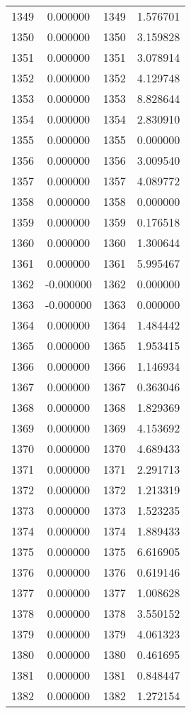 \documentclass[12pt]{article}
\begin{document}
\begin{longtable}{@{}cccc@{}}
1349 & 0.000000 & 1349 & 1.576701 \\
1350 & 0.000000 & 1350 & 3.159828 \\
1351 & 0.000000 & 1351 & 3.078914 \\
1352 & 0.000000 & 1352 & 4.129748 \\
1353 & 0.000000 & 1353 & 8.828644 \\
1354 & 0.000000 & 1354 & 2.830910 \\
1355 & 0.000000 & 1355 & 0.000000 \\
1356 & 0.000000 & 1356 & 3.009540 \\
1357 & 0.000000 & 1357 & 4.089772 \\
1358 & 0.000000 & 1358 & 0.000000 \\
1359 & 0.000000 & 1359 & 0.176518 \\
1360 & 0.000000 & 1360 & 1.300644 \\
1361 & 0.000000 & 1361 & 5.995467 \\
1362 & -0.000000 & 1362 & 0.000000 \\
1363 & -0.000000 & 1363 & 0.000000 \\
1364 & 0.000000 & 1364 & 1.484442 \\
1365 & 0.000000 & 1365 & 1.953415 \\
1366 & 0.000000 & 1366 & 1.146934 \\
1367 & 0.000000 & 1367 & 0.363046 \\
1368 & 0.000000 & 1368 & 1.829369 \\
1369 & 0.000000 & 1369 & 4.153692 \\
1370 & 0.000000 & 1370 & 4.689433 \\
1371 & 0.000000 & 1371 & 2.291713 \\
1372 & 0.000000 & 1372 & 1.213319 \\
1373 & 0.000000 & 1373 & 1.523235 \\
1374 & 0.000000 & 1374 & 1.889433 \\
1375 & 0.000000 & 1375 & 6.616905 \\
1376 & 0.000000 & 1376 & 0.619146 \\
1377 & 0.000000 & 1377 & 1.008628 \\
1378 & 0.000000 & 1378 & 3.550152 \\
1379 & 0.000000 & 1379 & 4.061323 \\
1380 & 0.000000 & 1380 & 0.461695 \\
1381 & 0.000000 & 1381 & 0.848447 \\
1382 & 0.000000 & 1382 & 1.272154 \\

\end{longtable}
\end{document}
